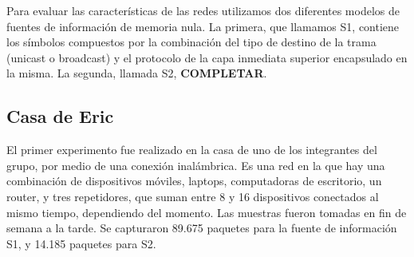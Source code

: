 
Para evaluar las características de las redes utilizamos dos diferentes modelos
de fuentes de información de memoria nula. La primera, que llamamos S1, contiene
los símbolos compuestos por la combinación del tipo de destino de la trama
(unicast o broadcast) y el protocolo de la capa inmediata superior encapsulado
en la misma. La segunda, llamada S2, \textbf{COMPLETAR}.

\subsection{Casa de Eric}
El primer experimento fue realizado en la casa de uno de los integrantes del grupo, por
medio de una conexión inalámbrica. Es una red en la que hay una combinación de dispositivos
móviles, laptops, computadoras de escritorio, un router, y tres repetidores, 
que suman entre 8 y 16 dispositivos conectados al mismo tiempo, dependiendo del momento.
Las muestras fueron tomadas en fin de semana a la tarde. Se capturaron 89.675 paquetes
para la fuente de información S1, y 14.185 paquetes para S2.
